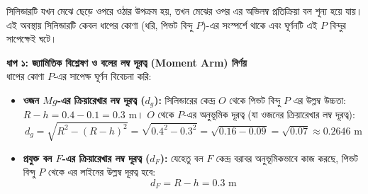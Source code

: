 \documentclass[12pt, a4paper]{article}
\begin{document}
\begin{tcolorbox}[solutionbox={সমাধান (Solution)}]
\noindent
সিলিন্ডারটি যখন মেঝে ছেড়ে ওপরে ওঠার উপক্রম হয়, তখন মেঝের ওপর এর অভিলম্ব প্রতিক্রিয়া বল শূন্য হয়ে যায়। এই অবস্থায় সিলিন্ডারটি কেবল ধাপের কোণা (ধরি, পিভট বিন্দু $P$)-এর সংস্পর্শে থাকে এবং ঘূর্ণনটি এই $P$ বিন্দুর সাপেক্ষেই ঘটে।

\vspace{0.5em}
\noindent
\textbf{ধাপ ১: জ্যামিতিক বিশ্লেষণ ও বলের লম্ব দূরত্ব (Moment Arm) নির্ণয়} \\
ধাপের কোণা $P$-এর সাপেক্ষ ঘূর্ণন বিবেচনা করি:
\begin{itemize}[leftmargin=*, parsep=0.4ex]
    \item \textbf{ওজন $Mg$-এর ক্রিয়ারেখার লম্ব দূরত্ব ($d_g$):} 
    সিলিন্ডারের কেন্দ্র $O$ থেকে পিভট বিন্দু $P$ এর উল্লম্ব উচ্চতা: $R - h = 0.4 - 0.1 = 0.3\text{ m}$। 
    $O$ থেকে $P$-এর অনুভূমিক দূরত্ব (যা ওজনের ক্রিয়ারেখার লম্ব দূরত্ব):
    $$d_g = \sqrt{R^2 - (R-h)^2} = \sqrt{0.4^2 - 0.3^2} = \sqrt{0.16 - 0.09} = \sqrt{0.07} \approx 0.2646\text{ m}$$
    
    \item \textbf{প্রযুক্ত বল $F$-এর ক্রিয়ারেখার লম্ব দূরত্ব ($d_F$):}
    যেহেতু বল $F$ কেন্দ্র বরাবর অনুভূমিকভাবে কাজ করছে, পিভট বিন্দু $P$ থেকে এর লাইনের উল্লম্ব দূরত্ব হবে:
    $$d_F = R - h = 0.3\text{ m}$$
\end{itemize}

\vspace{1em}
\begin{center}
\end{center}
\end{tcolorbox}
\end{document}

